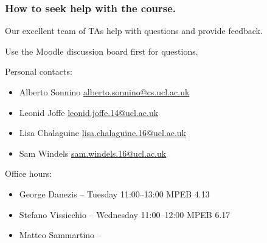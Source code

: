 \documentclass{beamer} %
\begin{document}
\begin{frame}
\frametitle{How to seek help with the course.} 

Our excellent team of TAs help with questions and provide feedback.

Use the Moodle discussion board first for questions.

\vspace{3mm}
Personal contacts:
\begin{itemize}
\item Alberto Sonnino \url{alberto.sonnino@cs.ucl.ac.uk}
\item Leonid Joffe \url{leonid.joffe.14@ucl.ac.uk}
\item Lisa Chalaguine \url{lisa.chalaguine.16@ucl.ac.uk}
\item Sam Windels \url{sam.windels.16@ucl.ac.uk}
\end{itemize}

\vspace{3mm}
Office hours:
\begin{itemize}
\item George Danezis -- Tuesday 11:00--13:00 MPEB 4.13
\item Stefano Vissicchio -- Wednesday 11:00--12:00 MPEB 6.17
\item Matteo Sammartino -- 
\end{itemize}


\end{frame}



\end{document}
